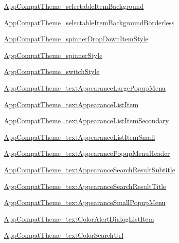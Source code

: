\begin{Desc}
\hyperlink{classandroid_1_1support_1_1v4_1_1_r_1_1styleable_ca3ef3993e097a2b6d8407610c33068d}{AppCompatTheme\_\-selectableItemBackground} 

\hyperlink{classandroid_1_1support_1_1v4_1_1_r_1_1styleable_113f8fa7701e681a079ae443df1e2758}{AppCompatTheme\_\-selectableItemBackgroundBorderless} 

\hyperlink{classandroid_1_1support_1_1v4_1_1_r_1_1styleable_2214d9a18b7e5f85a1399a543215d936}{AppCompatTheme\_\-spinnerDropDownItemStyle} 

\hyperlink{classandroid_1_1support_1_1v4_1_1_r_1_1styleable_07bdf94f02decf6c8be39649927ee6ad}{AppCompatTheme\_\-spinnerStyle} 

\hyperlink{classandroid_1_1support_1_1v4_1_1_r_1_1styleable_b500f751fdb168654edc56fa5b3f9455}{AppCompatTheme\_\-switchStyle} 

\hyperlink{classandroid_1_1support_1_1v4_1_1_r_1_1styleable_96bd7ab78a1b2db3505d8f14a3ca0737}{AppCompatTheme\_\-textAppearanceLargePopupMenu} 

\hyperlink{classandroid_1_1support_1_1v4_1_1_r_1_1styleable_942cd40a2b7ea9d627e07dc8a7b02152}{AppCompatTheme\_\-textAppearanceListItem} 

\hyperlink{classandroid_1_1support_1_1v4_1_1_r_1_1styleable_c4014b38c2c4cc12f0ebf7d747ad85fc}{AppCompatTheme\_\-textAppearanceListItemSecondary} 

\hyperlink{classandroid_1_1support_1_1v4_1_1_r_1_1styleable_e4cba9e6e74a50e8866c825124a656b8}{AppCompatTheme\_\-textAppearanceListItemSmall} 

\hyperlink{classandroid_1_1support_1_1v4_1_1_r_1_1styleable_3eaecb6b4885a61e22337bd4cace8963}{AppCompatTheme\_\-textAppearancePopupMenuHeader} 

\hyperlink{classandroid_1_1support_1_1v4_1_1_r_1_1styleable_62807726d61e458ec15ee48dbbc82a3e}{AppCompatTheme\_\-textAppearanceSearchResultSubtitle} 

\hyperlink{classandroid_1_1support_1_1v4_1_1_r_1_1styleable_81d84885678ba9df1805cb1815d7317c}{AppCompatTheme\_\-textAppearanceSearchResultTitle} 

\hyperlink{classandroid_1_1support_1_1v4_1_1_r_1_1styleable_49d918bd91325c5f25bb709c1dfaf57c}{AppCompatTheme\_\-textAppearanceSmallPopupMenu} 

\hyperlink{classandroid_1_1support_1_1v4_1_1_r_1_1styleable_6a0419e5a5e9ea88ff3f7d058fe92b7a}{AppCompatTheme\_\-textColorAlertDialogListItem} 

\hyperlink{classandroid_1_1support_1_1v4_1_1_r_1_1styleable_a36f1ef204a6d05d312ba3e930404faa}{AppCompatTheme\_\-textColorSearchUrl} 


\end{Desc}
